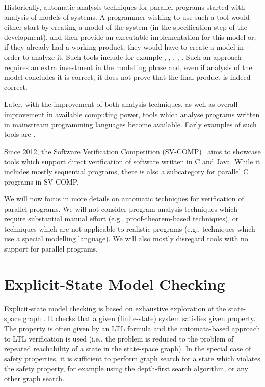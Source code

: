 Historically, automatic analysis techniques for parallel programs started with
analysis of models of systems.
A programmer wishing to use such a tool would either start by creating a model
of the system (in the specification step of the development), and then provide
an executable implementation for this model or, if they already had a working
product, they would have to create a model in order to analyze it.
Such tools include for example \cite{spin}, \cite{divine-mc}, \cite{ltsmin?}, \cite{uppall?}, \cite{TODO...}.
Such an approach requires an extra investment in the modelling phase and, even
if analysis of the model concludes it is correct, it does not prove that the
final product is indeed correct.

Later, with the improvement of both analysis techniques, as well as overall
improvement in available computing power, tools which analyse programs written
in mainstream programming languages become available.
Early examples of such tools are .

Since 2012, the Software Verification Competition (SV-COMP)~\cite{svc2020} aims
to showcase tools which support direct verification of software written in C
and Java.
While it includes mostly sequential programs, there is also a subcategory for
parallel C programs in SV-COMP.

We will now focus in more details on automatic techniques for verification of
parallel programs.
We will not consider program analysis techniques which require substantial manual effort (e.g., proof-theorem-based techniques), or techniques which are not applicable to realistic programs (e.g., techniques which use a special modelling language).
We will also mostly disregard tools with no support for parallel programs.

\section{Explicit-State Model Checking}

Explicit-state model checking is based on exhaustive exploration of the
state-space graph \cite{TODO}.
It checks that a given (finite-state) system satisfies given property.
The property is often given by an LTL formula and the automata-based approach
to LTL verification is used (i.e., the problem is reduced to the problem of
repeated reachability of a state in the state-space graph).
In the special case of safety properties, it is sufficient to perform graph
search for a state which violates the safety property, for example using the
depth-first search algorithm, or any other graph search.

